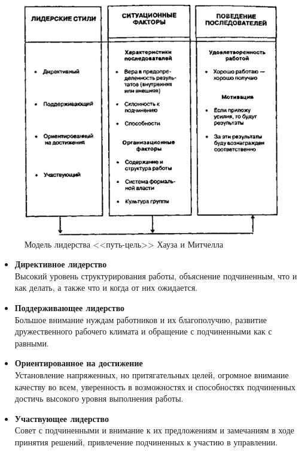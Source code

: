 \documentclass[a4paper,12pt,oneside,final]{extarticle}
\makeatletter
\numberwithin{equation}{section}
\def\maxwidth#1{\ifdim\Gin@nat@width>#1 #1\else\Gin@nat@width\fi}
\makeatother
\begin{document}
\begin{figure}[h]
	\centering
	\includegraphics[width=\maxwidth{\textwidth}]{management-figures/leadership_wg}
	\caption{Модель лидерства <<путь-цель>> Хауза и Митчелла}
\end{figure}
\begin{itemize}
	\item \textbf{Директивное лидерство} \\
	Высокий уровень структурирования работы, объяснение подчиненным, что и как делать, а также что и когда от них ожидается.
	\item \textbf{Поддерживающее лидерство} \\ 
	Большое внимание нуждам работников и их благополучию, развитие дружественного рабочего климата и обращение с подчиненными как с равными.
	\item \textbf{Ориентированное на достижение} \\
	Установление напряженных, но притягательных целей, огромное внимание качеству во всем, уверенность в возможностях и способностях подчиненных достичь высокого уровня выполнения работы.
	\item \textbf{Участвующее лидерство} \\
	Совет с подчиненными и внимание к их предложениям и замечаниям в ходе принятия решений, привлечение подчиненных к участию в управлении.
\end{itemize}	
\end{document}
